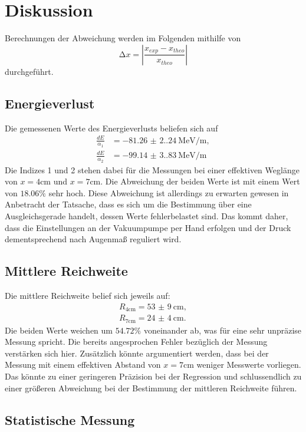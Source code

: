 \section{Diskussion}
\label{sec:Diskussion}

Berechnungen der Abweichung werden im Folgenden mithilfe von 
\begin{equation*}
    \increment x = \left| \frac{x_{exp}-x_{theo}}{x_{theo}} \right|
\end{equation*}
durchgeführt.

\subsection{Energieverlust}
Die gemessenen Werte des Energieverlusts beliefen sich auf 
\begin{align*}
    \frac{dE}{\alpha_1} &= \qty{-81.26(2.24)}{\mega\electronvolt\per\meter}, \\
    \frac{dE}{\alpha_2} &= \qty{-99.14(3.83)}{\mega\electronvolt\per\meter}
\end{align*}
Die Indizes 1 und 2 stehen dabei für die Messungen bei einer effektiven 
Weglänge von $x = 4 \unit{\centi\meter}$ und $x = 7 \unit{\centi\meter}$.
Die Abweichung der beiden Werte ist mit einem Wert von $18.06 \%$ sehr hoch.
Diese Abweichung ist allerdings zu erwarten gewesen in Anbetracht der Tatsache, 
dass es sich um die Bestimmung über eine Ausgleichsgerade handelt, dessen Werte 
fehlerbelastet sind. Das kommt daher, dass die Einstellungen an der Vakuumpumpe 
per Hand erfolgen und der Druck dementsprechend nach Augenmaß reguliert wird.

\subsection{Mittlere Reichweite}
Die mittlere Reichweite belief sich jeweils auf:
\begin{align}
    R_\text{4cm} = \qty{53(9)}{\centi\meter}, \\
    R_\text{7cm} = \qty{24(4)}{\centi\meter}.
\end{align}
Die beiden Werte weichen um $54.72 \%$ voneinander ab, was für eine sehr 
unpräzise Messung spricht. Die bereits angesprochen Fehler bezüglich der Messung 
verstärken sich hier. Zusätzlich könnte argumentiert werden, dass bei der 
Messung mit einem effektiven Abstand von $x = 7 \unit{\centi\meter}$ weniger
Messwerte vorliegen. Das könnte zu einer geringeren Präzision bei der Regression 
und schlussendlich zu einer größeren Abweichung bei der Bestimmung der mittleren 
Reichweite führen.

\subsection{Statistische Messung}